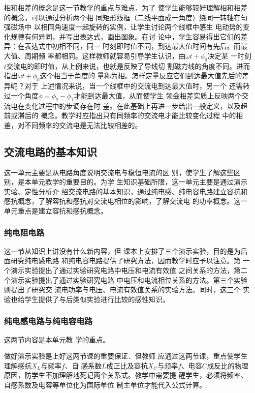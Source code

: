 相和相差的概念是这一节教学的重点与难点．为了
使学生能够较好理解相和相差的概念，可以通过分析两个相
同矩形线框（二线平面成一角度）绕同一转轴在匀强磁场中
以相同角速度一起旋转的实例，让学生讨论两个线框中感生
电动势的变化规律有何异同，并写出表达式，画出图象。在讨
论中，学生容易得出它们的差异：在表达式中初相不同，同一
时刻即时值不同，到达最大值时间有先后。而最大值、周期频
率都相同。这样教师就容易引导学生认识，由$\omega t+\phi_0$决定某
一时刻$t$交流电的即时值，从上例来说，也就是反映了导线切
割磁力线的角度不同。进而指出$\omega t+\phi_0$这个相当于角度的
量称为相。怎样定量反应它们到达最大值先后的差异呢？对于
上述情况来说，当一个线框中的交流电到达最大值时，另一个
还需转过一个角度$\phi=\phi_2-\phi_1$才能到达最大值，从而使学生
领会相差实质上反映两个交流电在变化过程中的步调存在时
差。在此基础上再进一步给出一般定义，以及超前或滞后的
概念。教学时应指出只有同频率的交流电才能比较变化过程
中的相差，对不同频率的交流电是无法比较相差的。


\subsection{交流电路的基本知识}
这一单元主要是从电路角度说明交流电与稳恒电流的区
别，使学生了解这些区别，是本单元教学的重要目的。为学
生知识基础所限，这一单元主要是通过演示实验、定性分析介
绍交流电路的基本知识，通过纯电感、纯电容电路建立容抗和
感抗概念，了解容抗和感抗对交流电相位的影响，了解交流电
的功率概念。这一单元重点是建立容抗和感抗概念。

\subsubsection{纯电阻电路}


 这一节从知识上讲没有什么新内容，但
课本上安排了三个演示实验，目的是为后面研究纯电感电路
和纯电容电路提供了研究方法，因而教学时应予以注意。第
一个演示实验提出了通过实验研究电路中电压和电流有效值
之间关系的方法，第二个演示实验提出了通过实验研究电路
中电压和电流相位关系的方法。第三个实验则提出了研究交
流电功率与电压、电流有效值关系的实验方法。同时，这三个
实验也给学生提供了与后类似实验进行比较的感性知识。

\subsubsection{纯电感电路与纯电容电路}

这两节内容是本单元教
学的重点。

做好演示实验是上好这两节课的重要保证．但教师
应通过这两节课，重点使学生理解感抗$X_L$与频率$f$、自
感系数$L$成正比及容抗$X_C$与频率$f$、电容$C$成反比的物理
原因，防学生不加理解地死记两个关系式。教学中需要提
醒学生，必须将频率、自感系数及电容等单位化为国际单位
制主单位才能代入公式计算。

